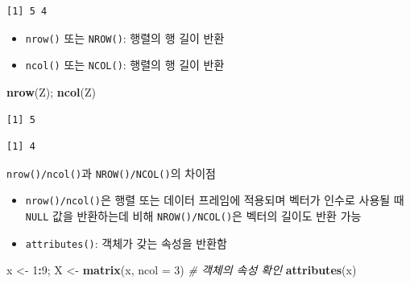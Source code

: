 \documentclass[
  11pt,
]{krantz}
\makeatletter
\newenvironment{Shaded}{\begin{snugshade}}{\end{snugshade}}
\newcommand{\CommentTok}[1]{\textcolor[rgb]{0.37,0.37,0.37}{\textit{#1}}}
\newcommand{\DataTypeTok}[1]{\textcolor[rgb]{0.27,0.27,0.27}{#1}}
\newcommand{\DecValTok}[1]{\textcolor[rgb]{0.06,0.06,0.06}{#1}}
\newcommand{\KeywordTok}[1]{\textcolor[rgb]{0.27,0.27,0.27}{\textbf{#1}}}
\newcommand{\NormalTok}[1]{#1}
\newcommand{\OperatorTok}[1]{\textcolor[rgb]{0.43,0.43,0.43}{\textbf{#1}}}
\newcommand{\StringTok}[1]{\textcolor[rgb]{0.5,0.5,0.5}{#1}}
\providecommand{\tightlist}{%
  \setlength{\itemsep}{0pt}\setlength{\parskip}{0pt}}
\newenvironment{kframe}{%
\medskip{}
\setlength{\fboxsep}{.8em}
 \def\at@end@of@kframe{}%
 \ifinner\ifhmode%
  \def\at@end@of@kframe{\end{minipage}}%
  \begin{minipage}{\columnwidth}%
 \fi\fi%
 \def\FrameCommand##1{\hskip\@totalleftmargin \hskip-\fboxsep
 \colorbox{shadecolor}{##1}\hskip-\fboxsep
     \hskip-\linewidth \hskip-\@totalleftmargin \hskip\columnwidth}%
 \MakeFramed {\advance\hsize-\width
   \@totalleftmargin\z@ \linewidth\hsize
   \@setminipage}}%
 {\par\unskip\endMakeFramed%
 \at@end@of@kframe}
\renewenvironment{quote}{\begin{kframe}}{\end{kframe}}
\makeatother
\begin{document}
\begin{verbatim}
[1] 5 4
\end{verbatim}

\normalsize

\begin{itemize}
\tightlist
\item
  \texttt{nrow()} 또는 \texttt{NROW()}: 행렬의 행 길이 반환
\item
  \texttt{ncol()} 또는 \texttt{NCOL()}: 행렬의 행 길이 반환
\end{itemize}

\footnotesize

\begin{Shaded}
\begin{Highlighting}[]
\KeywordTok{nrow}\NormalTok{(Z); }\KeywordTok{ncol}\NormalTok{(Z)}
\end{Highlighting}
\end{Shaded}

\begin{verbatim}
[1] 5
\end{verbatim}

\begin{verbatim}
[1] 4
\end{verbatim}

\normalsize

\begin{quote}
\texttt{nrow()/ncol()}과 \texttt{NROW()/NCOL()}의 차이점

\begin{itemize}
\tightlist
\item
  \texttt{nrow()/ncol()}은 행렬 또는 데이터 프레임에 적용되며 벡터가 인수로 사용될 때 \texttt{NULL} 값을 반환하는데 비해 \texttt{NROW()/NCOL()}은 벡터의 길이도 반환 가능
\end{itemize}
\end{quote}

\begin{itemize}
\tightlist
\item
  \texttt{attributes()}: 객체가 갖는 속성을 반환함
\end{itemize}

\footnotesize

\begin{Shaded}
\begin{Highlighting}[]
\NormalTok{x <-}\StringTok{ }\DecValTok{1}\OperatorTok{:}\DecValTok{9}\NormalTok{; X <-}\StringTok{ }\KeywordTok{matrix}\NormalTok{(x, }\DataTypeTok{ncol =} \DecValTok{3}\NormalTok{)}
\CommentTok{# 객체의 속성 확인}
\KeywordTok{attributes}\NormalTok{(x)}
\end{Highlighting}
\end{Shaded}
\end{document}
